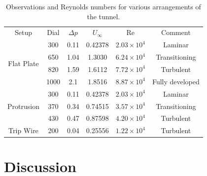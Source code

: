 \documentclass{article}
\begin{document}
\begin{table}[h]
    \centering
    \begin{tabular}{cccccc}
        \hline
        \multirow{2}{*}{Setup} & \multirow{2}{*}{Dial} & \multirow{2}{*}{$\Delta p$} & \multirow{2}{*}{$U_{\infty}$} & \multirow{2}{*}{Re} & \multirow{2}{*}{Comment} \\
        & & & & & \\
        \hline
        \hline
        \multirow{4}{*}{Flat Plate} & 300 & 0.11 & 0.42378 & $2.03 \times 10^4$ & Laminar \\
        & 650 & 1.04 & 1.3030 & $6.24 \times 10^4$ & Transitioning \\
        & 820 & 1.59 & 1.6112 & $7.72 \times 10^4$ & Turbulent \\
        & 1000 & 2.1 & 1.8516 & $8.87 \times 10^4$ & Fully developed \\
        \hline
        \hline
        \multirow{3}{*}{Protrusion} & 300 & 0.11 & 0.42378 & $2.03 \times 10^4$ & Laminar \\
        & 370 & 0.34 & 0.74515 & $3.57 \times 10^4$ & Transitioning \\
        & 430 & 0.47 & 0.87598 & $4.20 \times 10^4$ & Turbulent \\
        \hline
        \hline
        \multirow{1}{*}{Trip Wire} & 200 & 0.04 & 0.25556 & $1.22 \times 10^4$ & Turbulent \\
        \hline
    \end{tabular}
    \caption{Observations and Reynolds numbers for various arrangements of the tunnel.}
    \label{tab:observations}
\end{table}







\section{Discussion}





\end{document}
